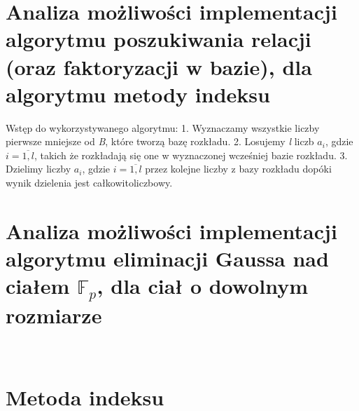 \documentclass[]{article}
\begin{document}
\section{Analiza możliwości implementacji algorytmu poszukiwania relacji (oraz faktoryzacji w bazie), dla algorytmu metody indeksu}

Wstęp do wykorzystywanego algorytmu:
1. Wyznaczamy wszystkie liczby pierwsze mniejsze od \textit{B}, które tworzą bazę rozkładu.
2. Losujemy \textit{l} liczb $a_i$, gdzie $i=\overline{1,l}$, takich że rozkładają się one w wyznaczonej wcześniej bazie rozkładu.
3. Dzielimy liczby $a_i$, gdzie $i=\overline{1,l}$ przez kolejne liczby z bazy rozkładu dopóki wynik dzielenia jest całkowitoliczbowy.\newline


\section{Analiza możliwości implementacji algorytmu eliminacji Gaussa nad ciałem $\mathbb{F}_p$, dla ciał o dowolnym rozmiarze}~

\section{Metoda indeksu}~
\end{document}
